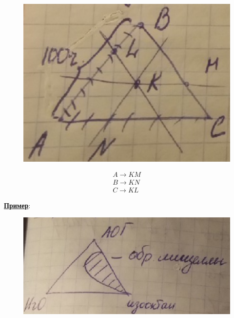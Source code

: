 \begin{lecture}
	\begin{lecSection}
		\begin{figure}
			\centering\includegraphics[width=\linewidth]{lecture_08/triangle_rozebum}
			\label{fig:triangle_rozebum}
		\end{figure}
	\begin{gather*}
		A \rightarrow KM \\
		B \rightarrow KN \\
		C \rightarrow KL
	\end{gather*}
	
	\centering\underline{\textbf{Пример}}:
	\begin{figure}[H]
		\centering\includegraphics[width=0.7\linewidth]{lecture_08/triangle_example}
		\label{fig:triangle_example}
	\end{figure}
	\end{lecSection}
	

\end{lecture}
